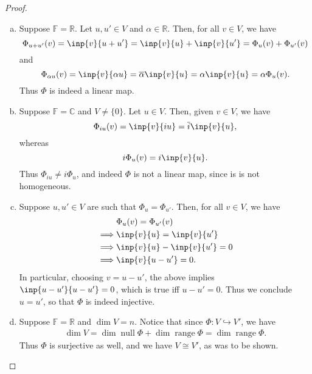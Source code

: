 \documentclass{extarticle}
\newcommand{\R}{\mathbb{R}}
\newcommand{\C}{\mathbb{C}}
\newcommand{\F}{\mathbb{F}}
\DeclareMathOperator{\Null}{null}
\DeclareMathOperator{\Range}{range}
\begin{document}
\begin{proof}
\begin{enumerate}[(a)]
\item Suppose $\F=\R$.  Let $u, u'\in V$ and $\alpha\in\R$.  Then, for all $v\in V$, we have
\begin{equation*}
\Phi_{u + u'}(v) = \inp{v}{u + u'} = \inp{v}{u} + \inp{v}{u'} = \Phi_u(v) + \Phi_{u'}(v)
\end{equation*}
and 
\begin{equation*}
\Phi_{\alpha u}(v) = \inp{v}{\alpha u} = \overline{\alpha}\inp{v}{u} = \alpha\inp{v}{u} = \alpha\Phi_u(v).
\end{equation*}
Thus $\Phi$ is indeed a linear map.
\item Suppose $\F = \C$ and $V \neq \{0\}$.  Let $u\in V$.  Then, given $v\in V$, we have
\begin{equation*}
\Phi_{iu}(v) = \inp{v}{iu} = \overline{i}\inp{v}{u},
\end{equation*}
whereas
\begin{equation*}
i\Phi_u(v) = i\inp{v}{u}.
\end{equation*}
Thus $\Phi_{iu} \neq i\Phi_u$, and indeed $\Phi$ is not a linear map, since is is not homogeneous.
\item Suppose $u, u'\in V$ are such that $\Phi_u = \Phi_{u'}$.  Then, for all $v\in V$, we have
\begin{align*}
&\Phi_u(v) = \Phi_{u'}(v)\\
\implies &\inp{v}{u} = \inp{v}{u'}\\
\implies &\inp{v}{u} - \inp{v}{u'} = 0\\
\implies &\inp{v}{u - u'} = 0.
\end{align*}
In particular, choosing $v = u - u'$, the above implies $\inp{u - u'}{u - u'}=0$, which is true iff $u - u' = 0$.  Thus we conclude $u = u'$, so that $\Phi$ is indeed injective.
\item Suppose $\F = \R$ and $\dim V = n$.  Notice that since $\Phi: V\hookrightarrow V'$, we have
\begin{align*}
\dim V = \dim\Null\Phi + \dim\Range\Phi = \dim\Range\Phi.
\end{align*}
Thus $\Phi$ is surjective as well, and we have $V \cong V'$, as was to be shown.  \qedhere
\end{enumerate}
\end{proof}


\end{document}
